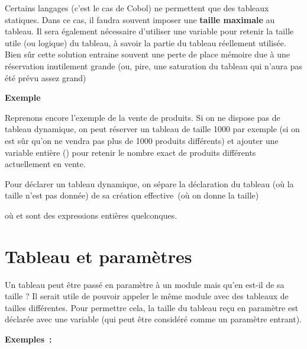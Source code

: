 	Certains langages (c’est le cas de Cobol) ne permettent 
	que des tableaux statiques. Dans ce cas, il faudra souvent
	imposer une \textbf{taille maximale} au tableau. 
	Il sera également nécessaire d’utiliser une variable 
	pour retenir la taille utile (ou logique) du tableau, 
	à savoir la partie du tableau réellement utilisée.
	Bien sûr cette solution entraine souvent une perte de place mémoire due
	à une réservation inutilement grande (ou, pire, une saturation du
	tableau qui n’aura pas été prévu assez grand)

	\textbf{Exemple}

	Reprenons encore l’exemple de la vente de produits. 
	Si on ne dispose pas de tableau dynamique, on peut réserver
	un tableau de taille 1000 par exemple (si on est sûr qu’on ne vendra
	pas plus de 1000 produits différents) et ajouter une variable entière
	() pour retenir 
	le nombre exact de produits différents actuellement en vente.

	Pour déclarer un tableau dynamique, on sépare la déclaration du tableau
	(où la taille n’est pas donnée) de sa création effective~(où on donne
	la taille)


	où  et  sont des
	expressions entières quelconques.

\section{Tableau et paramètres}

	Un tableau peut être passé en paramètre à un module mais qu’en est-il de
	sa taille ? Il serait utile de pouvoir appeler le même module avec des
	tableaux de tailles différentes. Pour permettre cela, la taille du
	tableau reçu en paramètre est déclarée avec une variable (qui peut être
	considéré comme un paramètre entrant).

	\textbf{Exemples~:}
	

